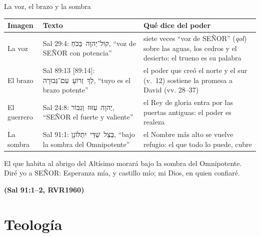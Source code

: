 \documentclass[hyperref={bookmarks=false},aspectratio=169]{beamer}
\newcommand{\heb}[1]{\mbox{\foreignlanguage{hebrew}{#1}}}
\newcommand{\SENOR}{S{\fontsize{0.78em}{1em}\selectfont EÑOR}}
\newcommand{\fuente}[1]{\par\hfill{\upshape\bfseries\footnotesize\textcolor{azul}{#1}}}
\begin{document}
\begin{frame}{La voz, el brazo y la sombra}
\scriptsize\renewcommand{\arraystretch}{1.18}
\begin{tabular}{@{}>{\RaggedRight\arraybackslash}p{2.0cm}>{\RaggedRight\arraybackslash}p{4.0cm}>{\RaggedRight\arraybackslash}p{5.9cm}@{}}
\toprule
\textbf{Imagen} & \textbf{Texto} & \textbf{Qué dice del poder} \\ \midrule
La voz & Sal 29:4: \heb{קוֹל־יְהוָה בַּכֹּחַ}, ``voz de \SENOR{} con potencia'' & siete veces ``voz de \SENOR'' (\emph{qol}) sobre las aguas, los cedros y el desierto: el trueno es su palabra \\
El brazo & Sal 89:13 [89:14]: \heb{לְךָ זְרוֹעַ עִם־גְּבוּרָה}, ``tuyo es el brazo potente'' & el poder que creó el norte y el sur (v.~12) sostiene la promesa a David (vv. 28--37) \\
El guerrero & Sal 24:8: \heb{יְהוָה עִזּוּז וְגִבּוֹר}, ``\SENOR{} el fuerte y valiente'' & el Rey de gloria entra por las puertas antiguas: el poder es realeza \\
La sombra & Sal 91:1: \heb{בְּצֵל שַׁדַּי יִתְלוֹנָן}, ``bajo la sombra del Omnipotente'' & el Nombre más alto se vuelve refugio: el que todo lo puede, cubre \\
\bottomrule
\end{tabular}\par\medskip
\begin{cita}El que habita al abrigo del Altísimo morará bajo la sombra del Omnipotente. Diré yo a \SENOR: Esperanza mía, y castillo mío; mi Dios, en quien confiaré.\fuente{(Sal 91:1--2, RVR1960)}\end{cita}
\end{frame}

\section{Teología}
\end{document}

